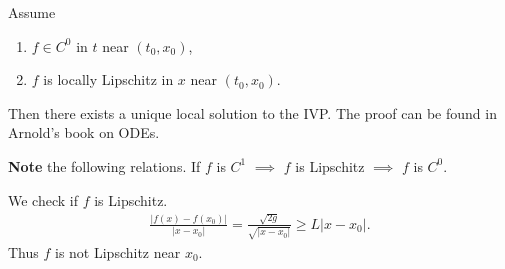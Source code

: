 \begin{theorem}[Picard]
	Assume 
	\begin{enumerate}
		\item  $f \in C^0$ in $t$ near $(t_0,  {x}_0)$,
		\item $f$ is locally Lipschitz in $ {x}$ near $(t_0,  {x}_0)$.
	\end{enumerate}
	Then there exists a unique local solution to the IVP. The proof can be found in Arnold's book on ODEs. 	
\end{theorem}
\textbf{Note} the following relations. If $f$ is $C^1$ $\implies$ $f $ is Lipschitz $\implies $ $f$ is $C^0$.
\begin{ex}
	We check if $f$ is Lipschitz.
	\begin{align}
		\frac{ | f(x) - f(x_0)  |}{ |x-x_0 |} = \frac{\sqrt{2g}}{\sqrt{ |x-x_0 |}} \geq  L  | x - x_0 |.
	\end{align}
Thus $f$ is not Lipschitz near $x_0$.	
\end{ex}

